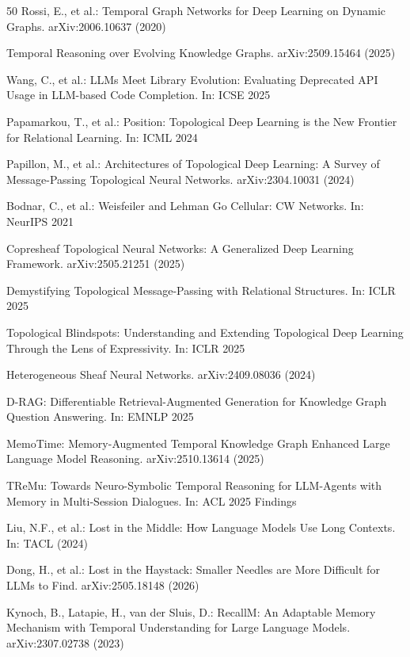 \documentclass[hf]{ceurart}
\begin{document}
\begin{thebibliography}{50}
Rossi, E., et al.: Temporal Graph Networks for Deep Learning on
Dynamic Graphs. arXiv:2006.10637 (2020)

Temporal Reasoning over Evolving Knowledge Graphs.
arXiv:2509.15464 (2025)

Wang, C., et al.: LLMs Meet Library Evolution: Evaluating Deprecated
API Usage in LLM-based Code Completion. In: ICSE 2025

Papamarkou, T., et al.: Position: Topological Deep Learning is the
New Frontier for Relational Learning. In: ICML 2024

Papillon, M., et al.: Architectures of Topological Deep Learning:
A Survey of Message-Passing Topological Neural Networks.
arXiv:2304.10031 (2024)

Bodnar, C., et al.: Weisfeiler and Lehman Go Cellular: CW Networks.
In: NeurIPS 2021

Copresheaf Topological Neural Networks: A Generalized Deep Learning
Framework. arXiv:2505.21251 (2025)

Demystifying Topological Message-Passing with Relational Structures.
In: ICLR 2025

Topological Blindspots: Understanding and Extending Topological Deep
Learning Through the Lens of Expressivity. In: ICLR 2025

Heterogeneous Sheaf Neural Networks. arXiv:2409.08036 (2024)

D-RAG: Differentiable Retrieval-Augmented Generation for Knowledge
Graph Question Answering. In: EMNLP 2025

MemoTime: Memory-Augmented Temporal Knowledge Graph Enhanced Large
Language Model Reasoning. arXiv:2510.13614 (2025)

TReMu: Towards Neuro-Symbolic Temporal Reasoning for LLM-Agents
with Memory in Multi-Session Dialogues. In: ACL 2025 Findings

Liu, N.F., et al.: Lost in the Middle: How Language Models Use Long
Contexts. In: TACL (2024)

Dong, H., et al.: Lost in the Haystack: Smaller Needles are More
Difficult for LLMs to Find. arXiv:2505.18148 (2026)

Kynoch, B., Latapie, H., van der Sluis, D.: RecallM: An Adaptable
Memory Mechanism with Temporal Understanding for Large Language Models.
arXiv:2307.02738 (2023)


\end{thebibliography}
\end{document}
